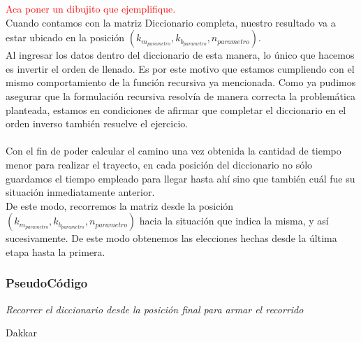 \textcolor{red}{Aca poner un dibujito que ejemplifique.}\\

Cuando contamos con la matriz Diccionario completa, nuestro resultado va a estar ubicado en la posici\'on $(k_{m_{parametro}},k_{b_{parametro}},n_{parametro})$.\\

Al ingresar los datos dentro del diccionario de esta manera, lo \'unico que hacemos es invertir el orden de llenado. Es por este motivo que estamos cumpliendo con el mismo comportamiento de la funci\'on recursiva ya mencionada. Como ya pudimos asegurar que la formulaci\'on recursiva resolv\'ia de manera correcta la problem\'atica planteada, estamos en condiciones de afirmar que completar el diccionario en el orden inverso tambi\'en resuelve el ejercicio.\\
\\


Con el fin de poder calcular el camino una vez obtenida la cantidad de tiempo menor para realizar el trayecto, en cada posici\'on del diccionario no s\'olo guardamos el tiempo empleado para llegar hasta ah\'i sino que tambi\'en cu\'al fue su situaci\'on inmediatamente anterior.\\

De este modo, recorremos la matriz  desde la posici\'on $(k_{m_{parametro}},k_{b_{parametro}},n_{parametro})$ hacia la situaci\'on que indica la misma, y as\'i sucesivamente. De este modo obtenemos las elecciones hechas desde la \'ultima etapa hasta la primera.

\newpage
\subsubsection*{PseudoC\'odigo}

\IncMargin{1em}
\begin{algorithm}
\BlankLine
\BlankLine
{}
\BlankLine
\emph{Recorrer el diccionario desde la posici\'on final para armar el recorrido}\;
\caption{Dakkar}%
\end{algorithm}\DecMargin{1em}

